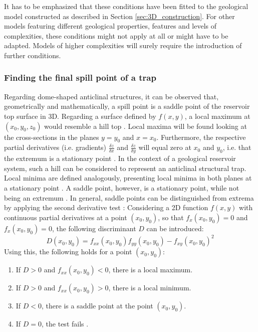 		It has to be emphasized that these conditions have been fitted to the geological model constructed as described in Section \ref{sec:3D_construction}. For other models featuring different geological properties, features and levels of complexities, these conditions might not apply at all or might have to be adapted. Models of higher complexities will surely require the introduction of further conditions.
		
			\subsubsection{Finding the final spill point of a trap} %
			Regarding dome-shaped anticlinal structures, it can be observed that, geometrically and mathematically, a spill point is a saddle point of the reservoir top surface in 3D. Regarding a surface defined by $f(x,y)$, a local maximum at $(x_0,y_0,z_0)$ would resemble a hill top \citep{guichard2013calculus}. Local maxima will be found looking at the cross-sections in the planes $y = y_0$ and $x = x_0$. Furthermore, the respective partial derivatives (i.e. gradients) $\frac{\delta z}{\delta x}$ and $\frac{\delta z}{\delta y}$ will equal zero at $x_0$ and $y_0$, i.e. that the extremum is a stationary point \citep{guichard2013calculus, weisstein2017saddlepoint}. In the context of a geological reservoir system, such a hill can be considered to represent an anticlinal structural trap. Local minima are defined analogously, presenting local minima in both planes at a stationary point \citep{guichard2013calculus}. A saddle point, however, is a stationary point, while not being an extremum \citep{weisstein2017saddlepoint}. In general, saddle points can be distinguished from extrema by applying the second derivative test \citep{guichard2013calculus, weisstein2017saddlepoint}: Considering a 2D function $f(x,y)$ with continuous partial derivatives at a  point $(x_0,y_0)$, so that $f_x(x_0,y_0) = 0$ and $f_x(x_0,y_0) = 0$, the following discriminant $D$ can be introduced:
			\begin{equation}\label{eq:discriminant_D}
			D(x_0,y_0) = f_{xx}(x_0,y_0)f_{yy}(x_0,y_0) - f_{xy}(x_0,y_0)^2
			\end{equation}
			Using this, the following holds for a point $(x_0,y_0)$:
			\begin{enumerate}
				\item If $D > 0$ and $f_{xx}(x_0,y_0) < 0$, there is a local maximum.
				\item If $D > 0$ and $f_{xx}(x_0,y_0) > 0$, there is a local minimum.
				\item If $D < 0$, there is a saddle point at the point $(x_0,y_0)$.
				\item If $D = 0$, the test fails \citep{guichard2013calculus}.
			\end{enumerate}
